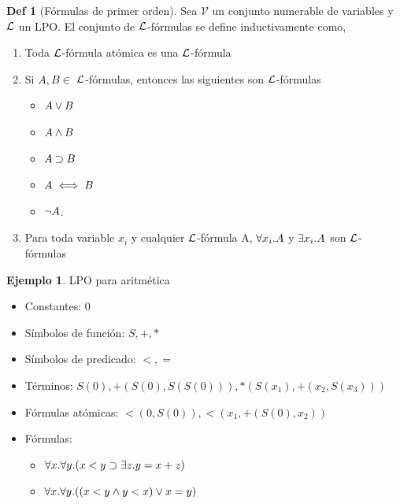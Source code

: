 \documentclass{report}
\theoremstyle{definition} %
\newtheorem*{definition*}{Def}
\newtheorem*{example*}{Ejemplo}
\begin{document}
\begin{definition*}[Fórmulas de primer orden]
    Sea $\mathcal{V}$ un conjunto numerable de variables y $\mathcal{L}$ un LPO. El
    conjunto de $\mathcal{L}$-fórmulas se define inductivamente como,
    \begin{enumerate}
        \item Toda $\mathcal{L}$-fórmula atómica es una $\mathcal{L}$-fórmula
        \item Si $A, B \in$ $\mathcal{L}$-fórmulas, entonces las siguientes son $\mathcal{L}$-fórmulas
        \begin{itemize}
            \item $A \vee B$
            \item $A \wedge B$
            \item $A \supset B$
            \item $A \iff B$
            \item $\neg A$.
        \end{itemize}
        \item Para toda variable $x_i$ y cualquier $\mathcal{L}$-fórmula A,
        $\forall x_i . A$ y $\exists x_i . A$ son $\mathcal{L}$-fórmulas
    \end{enumerate}
\end{definition*}

\begin{example*} LPO para aritmética
    
\begin{itemize}
    \item Constantes: $0$
    \item Símbolos de función: $S, +, *$
    \item Símbolos de predicado: $<, =$

    \item Términos: $S(0), +(S(0), S(S(0))), *(S(x_1), +(x_2, S(x_3)))$
    \item Fórmulas atómicas: $<(0, S(0)), <(x_1, +(S(0), x_2))$
    \item Fórmulas:
    \begin{itemize}
        \item $\forall x . \forall y . (
            x < y \supset \exists z . y = x + z
        )$
        \item $\forall x . \forall y . (
            (x < y \wedge y < x) \vee x = y
        )$
    \end{itemize}
\end{itemize}
\end{example*}
\end{document}
